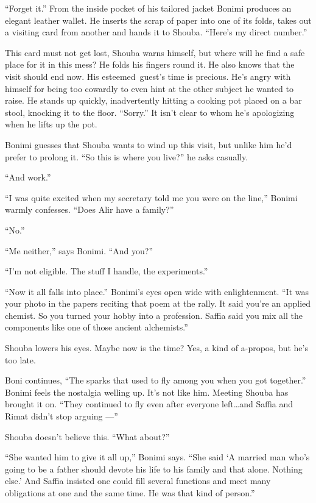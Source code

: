 \documentclass[twoside,11pt,openany]{book}
\begin{document}
``Forget it.'' From the inside pocket of his tailored jacket Bonimi produces an elegant
leather wallet. He inserts the scrap of paper into one of its folds, takes out a visiting card from another and hands
it to Shouba. ``Here's my direct number.''

This card must not get lost, Shouba warns himself, but where will he find a safe place for it in this mess? He folds his
fingers round it. He also knows that the visit should end now. His esteemed~guest's time is precious.
He's{ }angry with himself for being too cowardly to even hint at the other
subject he wanted to raise. He stands up quickly, inadvertently hitting a cooking pot placed on a bar stool, knocking
it to the floor. ``Sorry.'' It isn't clear to whom he's apologizing when he lifts up the
pot.

Bonimi guesses that Shouba wants to wind up this visit, but unlike him he'd prefer to prolong it. ``So this
is where you live?''  he asks casually.

``And work.''

``I was quite excited when my secretary told me you were on the line,'' Bonimi warmly
confesses. ``Does Alir have a family?''

``No.''

``Me neither,'' says Bonimi. ``And you?''

``I'm not eligible. The stuff I handle, the experiments.''

``Now it all falls into place.'' Bonimi's eyes open wide with enlightenment. ``It
was your photo in the papers reciting that poem at the rally. It said you're an applied chemist. So you turned your
hobby into a profession. Saffia said you mix all the components like one of those ancient alchemists.''

Shouba lowers his eyes. Maybe now is the time? Yes, a kind of a-propos, but he's too late.

Boni continues, ``The sparks that used to fly among you when you got together.'' Bonimi feels
the nostalgia welling up. It's not like him. Meeting Shouba has brought it on. ``They continued to fly
even after everyone left{\ldots}and Saffia and Rimat didn't stop arguing ---''

Shouba doesn't believe this. ``What about?''

``She wanted {him} to give it all up,'' Bonimi says. ``She said
`A married man who's going to be a father should devote his life to his family and that alone. Nothing else.{}' And
Saffia insisted one could fill several functions and meet many obligations at one and the same time. He was that kind
of person.''
\end{document}
